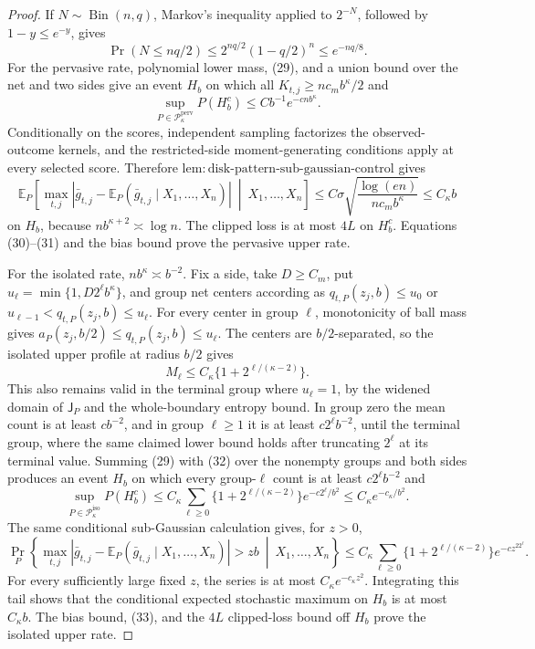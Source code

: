 \documentclass{article}
\begin{document}
\begin{proof}
If \(N\sim\operatorname{Bin}(n,q)\), Markov's inequality applied to
\(2^{-N}\), followed by \(1-y\le e^{-y}\), gives
\[
 \Pr(N\le nq/2)\le2^{nq/2}(1-q/2)^n\le e^{-nq/8}.
 \tag{29}
\]
For the pervasive rate, polynomial lower mass, (29), and a union bound
over the net and two sides give an event \(H_b\) on which all
\(K_{t,j}\ge nc_mb^{\kappa}/2\) and
\[
 \sup_{P\in\mathcal P_{\kappa}^{\mathrm{perv}}}P(H_b^c)
 \le Cb^{-1}e^{-cnb^{\kappa}}.
 \tag{30}
\]
Conditionally on the scores, independent sampling factorizes the
observed-outcome kernels, and the restricted-side moment-generating
conditions apply at every selected score.  Therefore
\(\mathrm{lem:disk\text{-}pattern\text{-}sub\text{-}gaussian\text{-}control}\)
gives
\[
 \mathbb E_P\!\left[
 \max_{t,j}|\bar g_{t,j}-\mathbb E_P(\bar g_{t,j}\mid X_1,\ldots,X_n)|
 \ \middle|\ X_1,\ldots,X_n\right]
 \le C\sigma\sqrt{\frac{\log(en)}{nc_mb^{\kappa}}}
 \le C_{\kappa}b
 \tag{31}
\]
on \(H_b\), because \(nb^{\kappa+2}\asymp\log n\).  The clipped loss
is at most \(4L\) on \(H_b^c\).  Equations (30)--(31) and the bias bound
prove the pervasive upper rate.

For the isolated rate, \(nb^{\kappa}\asymp b^{-2}\).  Fix a side, take
\(D\ge C_m\), put \(u_\ell=\min\{1,D2^\ell b^\kappa\}\), and group net
centers according as \(q_{t,P}(z_j,b)\le u_0\) or
\(u_{\ell-1}<q_{t,P}(z_j,b)\le u_\ell\).  For every center in group
\(\ell\), monotonicity of ball mass gives
\(a_P(z_j,b/2)\le q_{t,P}(z_j,b)\le u_\ell\).  The centers are
\(b/2\)-separated, so the isolated upper profile at radius \(b/2\)
gives
\[
 M_\ell\le C_\kappa\{1+2^{\ell/(\kappa-2)}\}.
 \tag{32}
\]
This also remains valid in the terminal group where \(u_\ell=1\), by
the widened domain of \(\mathsf J_P\) and the whole-boundary entropy
bound.  In group zero the mean count is at least \(cb^{-2}\), and in
group \(\ell\ge1\) it is at least \(c2^\ell b^{-2}\), until the terminal
group, where the same claimed lower bound holds after truncating
\(2^\ell\) at its terminal value.  Summing (29) with (32) over the
nonempty groups and both sides produces an event \(H_b\) on which every
group-\(\ell\) count is at least \(c2^\ell b^{-2}\) and
\[
 \sup_{P\in\mathcal P_{\kappa}^{\mathrm{iso}}}P(H_b^c)
 \le C_\kappa\sum_{\ell\ge0}
 \{1+2^{\ell/(\kappa-2)}\}e^{-c2^\ell/b^2}
 \le C_\kappa e^{-c_\kappa/b^2}.
 \tag{33}
\]
The same conditional sub-Gaussian calculation gives, for \(z>0\),
\[
 \Pr_P\!\left\{
 \max_{t,j}|\bar g_{t,j}-\mathbb E_P(\bar g_{t,j}\mid X_1,\ldots,X_n)|
 >zb\ \middle|\ X_1,\ldots,X_n\right\}
 \le C_\kappa\sum_{\ell\ge0}
 \{1+2^{\ell/(\kappa-2)}\}e^{-cz^22^\ell}.
 \tag{34}
\]
For every sufficiently large fixed \(z\), the series is at most
\(C_\kappa e^{-c_\kappa z^2}\).  Integrating this tail shows that the
conditional expected stochastic maximum on \(H_b\) is at most
\(C_\kappa b\).  The bias bound, (33), and the \(4L\) clipped-loss bound
off \(H_b\) prove the isolated upper rate.


\end{proof}
\end{document}
